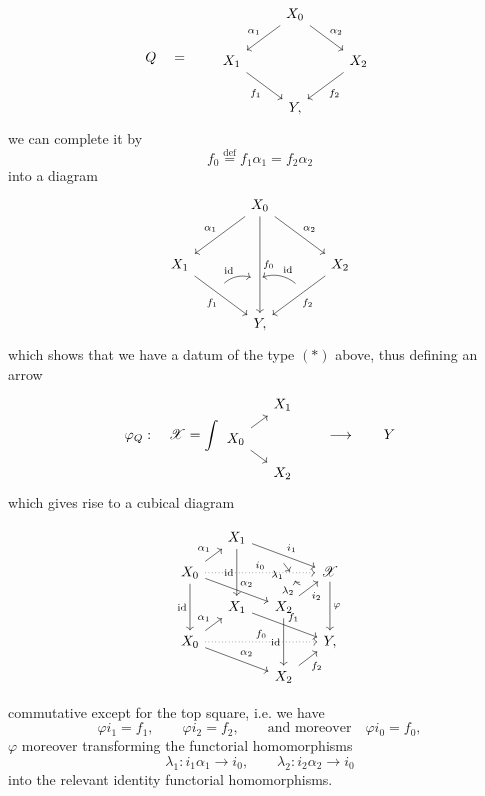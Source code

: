 \documentclass[11pt]{article}
\newcommand{\printedpage}[1]{\marginpar{\footnotesize p.~#1}}
\newcommand{\msp}[1]{\marginpar{\footnotesize [#1]}}
\newcommand{\sX}{\mathscr{X}}
\begin{document}
\printedpage{88}
\[
Q \quad = \qquad
\begin{tikzcd}
 & X_0 \arrow[dl, "\alpha_1"'] \arrow[dr, "\alpha_2"] & \\
X_1 \arrow[dr, "f_1"'] & & X_2 \arrow[dl, "f_2"] \\
 & Y, &
\end{tikzcd}
\]
we can complete it by
\[
f_0 \overset{\text{def}}{=} f_1\alpha_1 = f_2\alpha_2
\]
into a diagram
\[
\begin{tikzcd}[row sep=large, column sep=large]
 & X_0 \arrow[dl, "\alpha_1"'] \arrow[dr, "\alpha_2"] \arrow[dd, "f_0", ""'{name=F0, pos=0.65}] & \\
X_1 \arrow[dr, "f_1"', ""{name=F1, pos=0.4}] & & X_2 \arrow[dl, "f_2", ""'{name=F2, pos=0.4}] \\
 & Y, &
\arrow[from=F1, to=F0, bend left, "\mathrm{id}", shorten <=2pt, shorten >=2pt]
\arrow[from=F2, to=F0, bend right, "\mathrm{id}"', shorten <=2pt, shorten >=2pt]
\end{tikzcd}
\]
which shows that we have a datum of the type $(*)$ above, thus defining an arrow
\[
\varphi_Q : \quad \sX = \int
\begin{tikzcd}[row sep=small, column sep=small]
 & X_1 \\
X_0 \arrow[ur] \arrow[dr] & \\
 & X_2
\end{tikzcd}
\qquad \longrightarrow \qquad Y
\]
which gives rise to a cubical diagram

\msp{page 131}
\[
\begin{tikzcd}[row sep=small, column sep=small]
 & X_1 \arrow[dd, "\mathrm{id}"'] \arrow[rrd, "i_1", ""'{name=I1}] & & \\
X_0 \arrow[ru, "\alpha_1"] \arrow[rrr, dotted, "i_0", ""'{name=I0, pos=0.8}] \arrow[rrd, "\alpha_2"] \arrow[dd, "\mathrm{id}"'] & & & \sX \arrow[dd, "\varphi"] \\
 & X_1 \arrow[rrd, "f_1"] & X_2 \arrow[ru, "i_2"', ""{name=I2}] \arrow[dd, "\mathrm{id}"'] & \\
X_0 \arrow[ru, "\alpha_1"] \arrow[rrr, dotted, "f_0"] \arrow[rrd, "\alpha_2"] & & & Y, \\
 & & X_2 \arrow[ru, "f_2"'] &
\arrow[from=I1, to=I0, "\lambda_1"', shorten <=1pt, shorten >=1pt]
\arrow[from=I2, to=I0, bend left, "\lambda_2", shorten <=1pt, shorten >=1pt] %
\end{tikzcd}
\]

\printedpage{89}
commutative except for the top square, i.e. we have
\[
\varphi i_1 = f_1, \qquad \varphi i_2 = f_2, \qquad \text{and moreover} \quad \varphi i_0 = f_0,
\]
$\varphi$ moreover transforming the functorial homomorphisms
\[
\lambda_1 : i_1\alpha_1 \longrightarrow i_0, \qquad \lambda_2 : i_2\alpha_2 \longrightarrow i_0
\]
into the relevant identity functorial homomorphisms.
\end{document}
